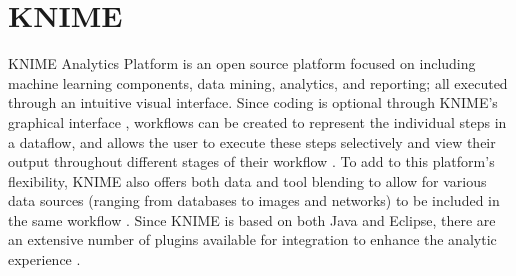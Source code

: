 \section{KNIME}

KNIME Analytics Platform \cite{hid-sp18-504-pred-knime} is an open source 
platform focused on including machine learning components, data mining, 
analytics, and reporting; all executed through an intuitive visual interface. 
Since coding is optional through KNIME's graphical 
interface \cite{hid-sp18-504-knime}, workflows can be created to represent the 
individual steps in a dataflow, and allows the user to execute these steps 
selectively and view their output throughout different stages of their 
workflow \cite{hid-sp18-504-pred-knime}. To add to this platform's flexibility,
KNIME also offers both data and tool blending to allow for various data sources
(ranging from databases to images and networks) to be included in the same
workflow \cite{hid-sp18-504-knime}. Since KNIME is based on both Java 
and Eclipse, there are an extensive number of plugins available for 
integration to enhance the analytic experience \cite{hid-sp18-504-pred-knime}.
